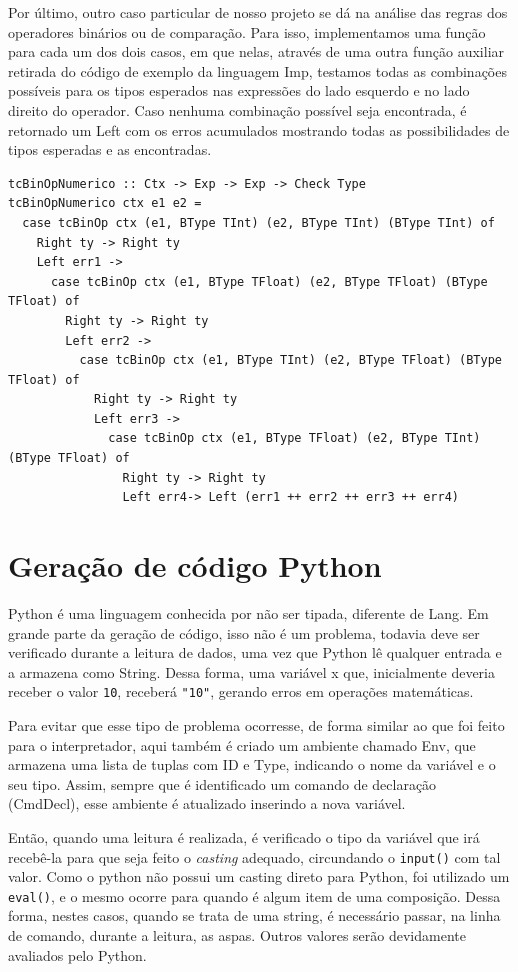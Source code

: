 \documentclass{article}
\begin{document}
    Por último, outro caso particular de nosso projeto se dá na análise das regras dos operadores binários ou de comparação. Para isso, implementamos uma função para cada um dos dois casos, em que nelas, através de uma outra função auxiliar retirada do código de exemplo da linguagem Imp, testamos todas as combinações possíveis para os tipos esperados nas expressões do lado esquerdo e no lado direito do operador. Caso nenhuma combinação possível seja encontrada, é retornado um Left com os erros acumulados mostrando todas as possibilidades de tipos esperadas e as encontradas.

    \begin{lstlisting}
tcBinOpNumerico :: Ctx -> Exp -> Exp -> Check Type
tcBinOpNumerico ctx e1 e2 = 
  case tcBinOp ctx (e1, BType TInt) (e2, BType TInt) (BType TInt) of
    Right ty -> Right ty
    Left err1 ->
      case tcBinOp ctx (e1, BType TFloat) (e2, BType TFloat) (BType TFloat) of
        Right ty -> Right ty
        Left err2 -> 
          case tcBinOp ctx (e1, BType TInt) (e2, BType TFloat) (BType TFloat) of
            Right ty -> Right ty
            Left err3 -> 
              case tcBinOp ctx (e1, BType TFloat) (e2, BType TInt) (BType TFloat) of
                Right ty -> Right ty
                Left err4-> Left (err1 ++ err2 ++ err3 ++ err4)
    \end{lstlisting}
   
\section{Geração de código Python}

    Python é uma linguagem conhecida por não ser tipada, diferente de Lang. Em grande parte da geração de código, isso não é um problema, todavia deve ser verificado durante a leitura de dados, uma vez que Python lê qualquer entrada e a armazena como String. Dessa forma, uma variável x que, inicialmente deveria receber o valor \verb|10|, receberá \verb|"10"|, gerando erros em operações matemáticas.

    Para evitar que esse tipo de problema ocorresse, de forma similar ao que foi feito para o interpretador, aqui também é criado um ambiente chamado Env, que armazena uma lista de tuplas com ID e Type, indicando o nome da variável e o seu tipo. Assim, sempre que é identificado um comando de declaração (CmdDecl), esse ambiente é atualizado inserindo a nova variável.

    Então, quando uma leitura é realizada, é verificado o tipo da variável que irá recebê-la para que seja feito o \textit{casting} adequado, circundando o \verb|input()| com tal valor. Como o python não possui um casting direto para Python, foi utilizado um \verb|eval()|, e o mesmo ocorre para quando é algum item de uma composição. Dessa forma, nestes casos, quando se trata de uma string, é necessário passar, na linha de comando, durante a leitura, as aspas. Outros valores serão devidamente avaliados pelo Python.
\end{document}
